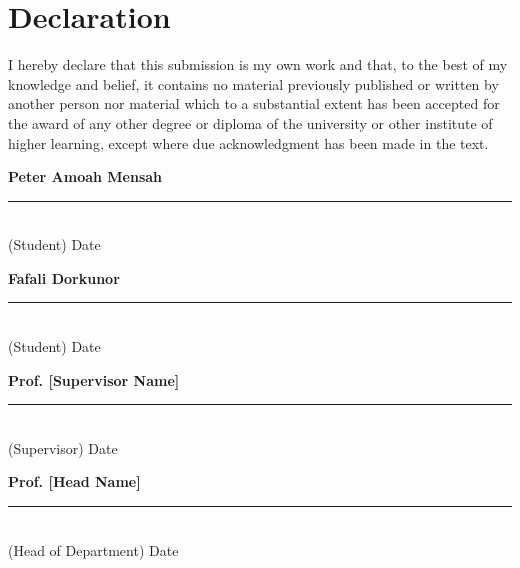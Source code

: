 \chapter*{Declaration}
I hereby declare that this submission is my own work and that, to the best of my knowledge and belief, it contains no material previously published or written by another person nor material which to a substantial extent has been accepted for the award of any other degree or diploma of the university or other institute of higher learning, except where due acknowledgment has been made in the text.

\vspace{1.5cm}
\noindent \textbf{Peter Amoah Mensah} \hfill \rule{4cm}{0.4pt}\\
(Student) \hfill Date

\vspace{1.5cm}
\noindent \textbf{Fafali Dorkunor} \hfill \rule{4cm}{0.4pt}\\
(Student) \hfill Date

\vspace{1.5cm}
\noindent \textbf{Prof. [Supervisor Name]} \hfill \rule{4cm}{0.4pt}\\
(Supervisor) \hfill Date

\vspace{1.5cm}
\noindent \textbf{Prof. [Head Name]} \hfill \rule{4cm}{0.4pt}\\
(Head of Department) \hfill Date
